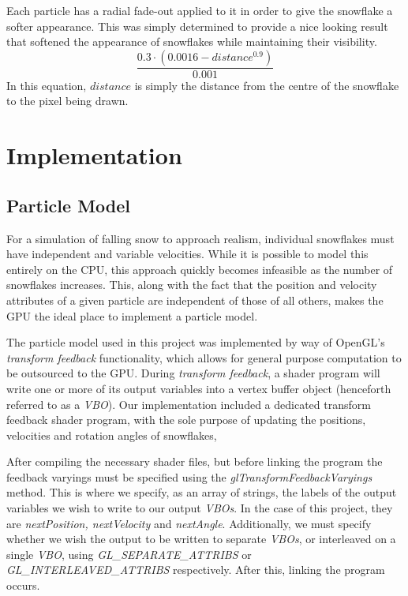 \documentclass[conference]{acmsiggraph}
\begin{document}
Each particle has a radial fade-out applied to it in order to give the snowflake a softer appearance. This was simply determined to provide a nice looking result that softened the appearance of snowflakes while maintaining their visibility.
\begin{equation} \label{eq:alpha}
\frac{0.3 \cdot (0.0016 - distance^{0.9})} {0.001}
\end{equation}
In this equation, $distance$ is simply the distance from the centre of the snowflake to the pixel being drawn.

\section{Implementation}

\subsection{Particle Model}
For a simulation of falling snow to approach realism, individual snowflakes must have independent and variable velocities. While it is possible to model this entirely on the CPU, this approach quickly becomes infeasible as the number of snowflakes increases. This, along with the fact that the position and velocity attributes of a given particle are independent of those of all others, makes the GPU the ideal place to implement a particle model.

The particle model used in this project was implemented by way of OpenGL's \textit{transform feedback} functionality, which allows for general purpose computation to be outsourced to the GPU. During \textit{transform feedback}, a shader program will write one or more of its output variables into a vertex buffer object (henceforth referred to as a \textit{VBO}). Our implementation included a dedicated transform feedback shader program, with the sole purpose of updating the positions, velocities and rotation angles of snowflakes, 

After compiling the necessary shader files, but before linking the program the feedback varyings must be specified using the \textit{glTransformFeedbackVaryings} method. This is where we specify, as an array of strings, the labels of the output variables we wish to write to our output \textit{VBOs}. In the case of this project, they are \textit{nextPosition, nextVelocity} and \textit{nextAngle}. Additionally, we must specify whether we wish the output to be written to separate \textit{VBOs}, or interleaved on a single \textit{VBO}, using \textit{GL\_SEPARATE\_ATTRIBS} or \textit{GL\_INTERLEAVED\_ATTRIBS} respectively. After this, linking the program occurs.
\end{document}
